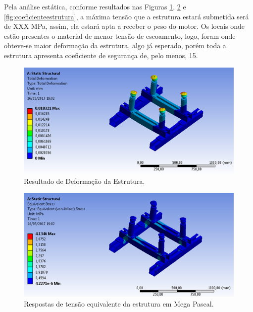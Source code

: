 Pela análise estática, conforme resultados nas Figuras \ref{fig:deformacao}, \ref{fig:pascal} e \ref{fig:coeficienteestrutura}, a máxima tensão que a estrutura estará submetida será de XXX MPa, assim, ela estará apta a receber o peso do motor. Os locais onde estão presentes o material de menor tensão de escoamento, logo, foram onde obteve-se maior deformação da estrutura, algo já esperado, porém toda a estrutura apresenta coeficiente de segurança de, pelo menos, 15.

\begin{figure}[h!]
	\centering
	\includegraphics[keepaspectratio=true,scale= 0.8]{figuras/resultado-deformacao.png}
	\caption{Resultado de Deformação da Estrutura.}
	\label{fig:deformacao}
\end{figure}

\begin{figure}[h!]
	\centering
	\includegraphics[keepaspectratio=true,scale= 0.8]{figuras/pascal.png}
	\caption{Respostas de tensão equivalente da estrutura em Mega Pascal.}
	\label{fig:pascal}
\end{figure}

